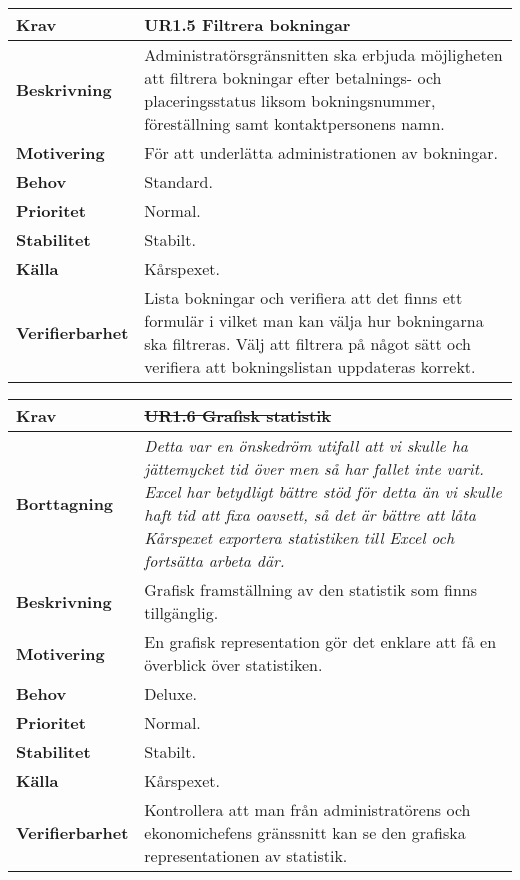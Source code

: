 \documentclass[a4paper, twoside, 11pt, titlepage]{article}
\begin{document}
		\begin {table} [ht] \begin{tabular} { p{2.6cm} p{12.5cm} }
			\hline
			{\sffamily\textbf{Krav}} & {\sffamily\textbf{UR1.5 Filtrera bokningar }} \\
			\hline
			{\sffamily\textbf{Beskrivning}} & {Administratörsgränsnitten ska erbjuda möjligheten att filtrera bokningar efter betalnings- och placeringsstatus liksom bokningsnummer, föreställning samt kontaktpersonens namn.} \\
			\hline
			{\sffamily\textbf{Motivering}} & {För att underlätta administrationen av bokningar.} \\
			\hline
			{\sffamily\textbf{Behov}} & {Standard.} \\
			\hline
			{\sffamily\textbf{Prioritet}} & {Normal.} \\
			\hline
			{\sffamily\textbf{Stabilitet}} & {Stabilt.} \\
			\hline
			{\sffamily\textbf{Källa}} & {Kårspexet.} \\
			\hline
			{\sffamily\textbf{Verifierbarhet}} & {Lista bokningar och verifiera att det finns ett formulär i vilket man kan välja hur bokningarna ska filtreras. Välj att filtrera på något sätt och verifiera att bokningslistan uppdateras korrekt.} \\
			\hline
		\end{tabular} \end{table} \FloatBarrier
		\vspace{6mm}

		\begin {table} [ht] \begin{tabular} { p{2.6cm} p{12.5cm} }
			\hline
			{\sffamily\textbf{Krav}} & {\sffamily\textbf{\sout{UR1.6 Grafisk statistik}}} \\
			\hline
			{\sffamily\textbf{Borttagning}} & {\emph{Detta var en önskedröm utifall att vi skulle ha jättemycket tid över men så har fallet inte varit. Excel har betydligt bättre stöd för detta än vi skulle haft tid att fixa oavsett, så det är bättre att låta Kårspexet exportera statistiken till Excel och fortsätta arbeta där.}} \\
			\hline
			{\sffamily\textbf{Beskrivning}} & {Grafisk framställning av den statistik som finns tillgänglig.} \\
			\hline
			{\sffamily\textbf{Motivering}} & {En grafisk representation gör det enklare att få en överblick över statistiken.} \\
			\hline
			{\sffamily\textbf{Behov}} & {Deluxe.} \\
			\hline
			{\sffamily\textbf{Prioritet}} & {Normal.} \\
			\hline
			{\sffamily\textbf{Stabilitet}} & {Stabilt.} \\
			\hline
			{\sffamily\textbf{Källa}} & {Kårspexet.} \\
			\hline
			{\sffamily\textbf{Verifierbarhet}} & {Kontrollera att man från administratörens och ekonomichefens gränssnitt kan se den grafiska representationen av statistik.} \\
			\hline
		\end{tabular} \end{table} \FloatBarrier
		\vspace{6mm}
\end{document}
